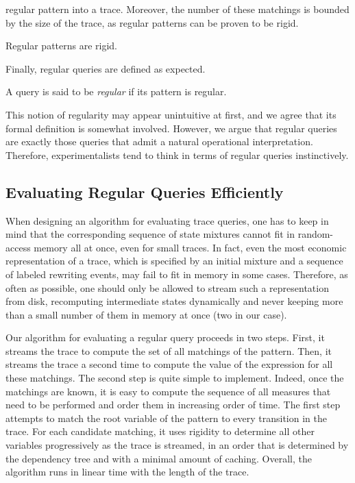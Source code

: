 \documentclass[runningheads]{llncs}
\begin{document}
regular pattern into a trace. Moreover, the number of these matchings
is bounded by the size of the trace, as regular patterns can be proven
to be rigid.
\begin{proposition}\label{prop:regular-rigid}
  Regular patterns are rigid.
\end{proposition}
Finally, regular queries are defined as expected.
\begin{definition}
  A query is said to be \emph{regular} if its pattern is regular.
\end{definition}
This notion of regularity may appear unintuitive at first, and we
agree that its formal definition is somewhat involved. However, we
argue that regular queries are exactly those queries that admit a
natural operational interpretation. Therefore, experimentalists tend
to think in terms of regular queries instinctively.


\subsection{Evaluating Regular Queries
  Efficiently}\label{subsec:evalq}

When designing an algorithm for evaluating trace queries, one has to
keep in mind that the corresponding sequence of state mixtures cannot
fit in random-access memory all at once, even for small traces. In
fact, even the most economic representation of a trace, which is
specified by an initial mixture and a sequence of labeled rewriting
events, may fail to fit in memory in some cases. Therefore, as often
as possible, one should only be allowed to stream such a
representation from disk, recomputing intermediate states dynamically
and never keeping more than a small number of them in memory at once
(two in our case).

Our algorithm for evaluating a regular query proceeds in two
steps. First, it streams the trace to compute the set of all matchings
of the pattern. Then, it streams the trace a second time to compute
the value of the expression for all these matchings. The second step
is quite simple to implement. Indeed, once the matchings are known, it
is easy to compute the sequence of all measures that need to be
performed and order them in increasing order of time. The first step
attempts to match the root variable of the pattern to every transition
in the trace. For each candidate matching, it uses rigidity to
determine all other variables progressively as the trace is streamed,
in an order that is determined by the dependency tree and with a
minimal amount of caching. Overall, the algorithm runs in linear time 
with the length of the trace.
\end{document}
